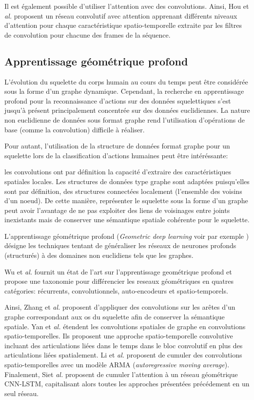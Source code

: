 Il est également possible d'utiliser l'attention avec des convolutions.
Ainsi, Hou et\textit{ al.}\cite{hou2018spatial} proposent un réseau convolutif avec attention apprenant différents niveaux d'attention pour chaque caractéristique spatio-temporelle extraite par les filtres de convolution pour chacune des  frames de la séquence.

\subsection{Apprentissage géométrique profond}
L'évolution du squelette du corps humain au cours du temps peut être considérée sous la forme d'un graphe dynamique. Cependant, la recherche en apprentissage profond pour la reconnaissance d'actions sur des données squelettiques s'est jusqu'à présent principalement concentrée sur des données euclidiennes.
La nature non euclidienne de données sous format graphe rend l'utilisation d'opérations de base (comme la convolution) difficile à réaliser. 

Pour autant, l'utilisation de la structure de données format graphe pour un squelette lors de la classification d'actions humaines peut être intéréssante:

les convolutions ont par définition la capacité d'extraire des caractéristiques spatiales locales. Les structures de données type graphe sont adaptées puisqu'elles sont par définition, des structures connectées localement (l’ensemble des voisins d’un noeud). De cette manière, représenter le squelette sous la forme d'un graphe peut avoir l'avantage de ne pas exploiter des liens de voisinages entre joints inexistants mais de conserver une sémantique spatiale cohérente pour le squelette.

L'apprentissage géométrique profond (\textit{Geometric deep learning} voir par exemple \cite{gori2005new,scarselli2008graph,bronstein2017geometric}) désigne les techniques tentant de généraliser les réseaux de neurones profonds (structurés) à des domaines non euclidiens tels que les graphes. 

Wu et\textit{ al.} \cite{wu2019comprehensive} fournit un état de l'art sur l'apprentissage geométrique profond et propose une taxonomie pour différencier les reseaux géométriques en quatres catégories: récurrents, convolutionnels, auto-encodeurs et spatio-temporels.

Ainsi, Zhang et\textit{ al.} \cite{2018arXiv180506184Z} proposent d'appliquer des convolutions sur les arêtes d'un graphe correspondant aux os du squelette afin de conserver la sémantique spatiale.
Yan et\textit{ al.} \cite{yan2018spatial} étendent les convolutions spatiales de graphe en convolutions spatio-temporelles. Ils proposent une approche spatio-temporelle convolutive incluant des articulations liées dans le temps dans le bloc convolutif en plus des articulations liées spatialement. Li et\textit{ al.}\cite{2018arXiv180209834L} proposent de cumuler des convolutions spatio-temporelles avec un modèle ARMA (\textit{autoregressive moving average}). Finalement, Siet\textit{ al.} \cite{Si_2019_CVPR} proposent de cumuler l'attention à un réseau géométrique CNN-LSTM, capitalisant alors toutes les approches présentées précédement en un seul réseau.

